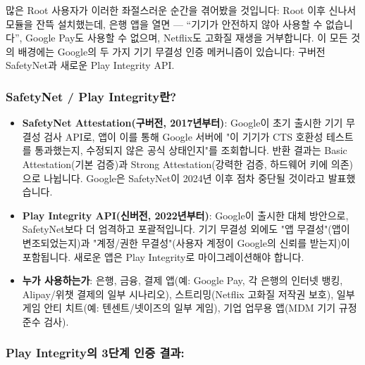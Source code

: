 
많은 Root 사용자가 이러한 좌절스러운 순간을 겪어봤을 것입니다: Root 이후 신나서 모듈을 잔뜩 설치했는데, 은행 앱을 열면 — “기기가 안전하지 않아 사용할 수 없습니다”, Google Pay도 사용할 수 없으며, Netflix도 고화질 재생을 거부합니다. 이 모든 것의 배경에는 Google의 두 가지 기기 무결성 인증 메커니즘이 있습니다: 구버전 SafetyNet과 새로운 Play Integrity API.

\subsubsection*{SafetyNet / Play Integrity란?}

\begin{itemize}
  \item \textbf{SafetyNet Attestation(구버전, 2017년부터)}: Google이 초기 출시한 기기 무결성 검사 API로, 앱이 이를 통해 Google 서버에 "이 기기가 CTS 호환성 테스트를 통과했는지, 수정되지 않은 공식 상태인지"를 조회합니다. 반환 결과는 Basic Attestation(기본 검증)과 Strong Attestation(강력한 검증, 하드웨어 키에 의존)으로 나뉩니다. Google은 SafetyNet이 2024년 이후 점차 중단될 것이라고 발표했습니다.
  \item \textbf{Play Integrity API(신버전, 2022년부터)}: Google이 출시한 대체 방안으로, SafetyNet보다 더 엄격하고 포괄적입니다. 기기 무결성 외에도 "앱 무결성"(앱이 변조되었는지)과 "계정/권한 무결성"(사용자 계정이 Google의 신뢰를 받는지)이 포함됩니다. 새로운 앱은 Play Integrity로 마이그레이션해야 합니다.
  \item \textbf{누가 사용하는가}: 은행, 금융, 결제 앱(예: Google Pay, 각 은행의 인터넷 뱅킹, Alipay/위챗 결제의 일부 시나리오), 스트리밍(Netflix 고화질 저작권 보호), 일부 게임 안티 치트(예: 텐센트/넷이즈의 일부 게임), 기업 업무용 앱(MDM 기기 규정 준수 검사).
\end{itemize}

\subsubsection*{Play Integrity의 3단계 인증 결과:}

